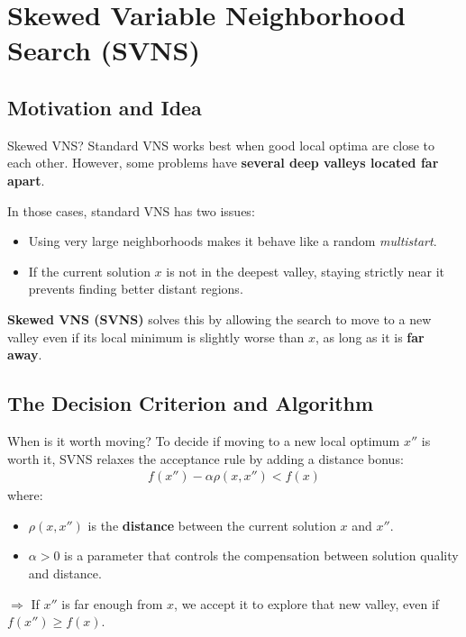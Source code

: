 \documentclass{beamer}
\begin{document}

\section{Skewed Variable Neighborhood Search (SVNS)}

\subsection{Motivation and Idea}
\begin{frame}{Skewed VNS?}
\quad Standard VNS works best when good local optima are close to each other. However, some problems have \textbf{several deep valleys located far apart}.

\vspace{0.2cm}
In those cases, standard VNS has two issues:
\begin{itemize}
\item Using very large neighborhoods makes it behave like a random \textit{multistart}.
\item If the current solution $x$ is not in the deepest valley, staying strictly near it prevents finding better distant regions.
\end{itemize}

\vspace{0.2cm}
\textbf{Skewed VNS (SVNS)} solves this by allowing the search to move to a new valley even if its local minimum is slightly worse than $x$, as long as it is \textbf{far away}.
\end{frame}

\subsection{The Decision Criterion and Algorithm}
\begin{frame}{When is it worth moving?}
\quad To decide if moving to a new local optimum $x''$ is worth it, SVNS relaxes the acceptance rule by adding a distance bonus:
\begin{gather*}
    f(x'') - \alpha \rho(x, x'') < f(x)
\end{gather*}
where:
\begin{itemize}
\item $\rho(x, x'')$ is the \textbf{distance} between the current solution $x$ and $x''$.
\item $\alpha > 0$ is a parameter that controls the compensation between solution quality and distance.
\end{itemize}

\vspace{0.2cm}
$\Rightarrow$ If $x''$ is far enough from $x$, we accept it to explore that new valley, even if $f(x'') \geq f(x)$.
\end{frame}
\end{document}
